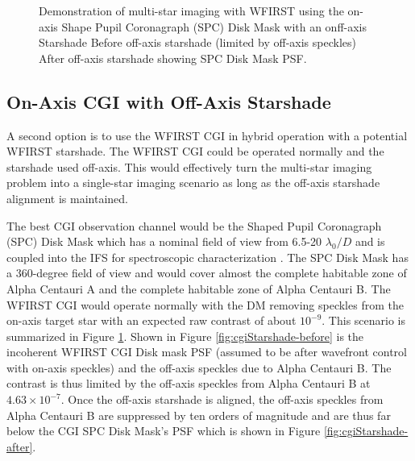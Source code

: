 \documentclass[]{spie}  %
\begin{document}
\begin{figure}[t!]
\centering
{}
\caption[Companion Leakage]
{\label{fig:cgiStarshade} Demonstration of multi-star imaging with WFIRST using the on-axis Shape Pupil Coronagraph (SPC) Disk Mask with an onff-axis Starshade  Before off-axis starshade (limited by off-axis speckles)  After off-axis starshade showing SPC Disk Mask PSF.}
\end{figure}

\subsection{On-Axis CGI with Off-Axis Starshade}

A second option is to use the WFIRST CGI in hybrid operation with a potential WFIRST starshade. The WFIRST CGI could be operated normally and the starshade used off-axis. This would effectively turn the multi-star imaging problem into a single-star imaging scenario as long as the off-axis starshade alignment is maintained.

The best CGI observation channel would be the Shaped Pupil Coronagraph (SPC) Disk Mask which has a nominal field of view from 6.5-20 $\lambda_0 / D$ and is coupled into the IFS for spectroscopic characterization \cite{Riggs17}. The SPC Disk Mask has a 360-degree field of view and would cover almost the complete habitable zone of Alpha Centauri A and the complete habitable zone of Alpha Centauri B. The WFIRST CGI would operate normally with the DM removing speckles from the on-axis target star with an expected raw contrast of about $10^{-9}$. This scenario is summarized in Figure \ref{fig:cgiStarshade}. Shown in Figure \ref{fig:cgiStarshade-before} is the incoherent WFIRST CGI Disk mask PSF (assumed to be after wavefront control with on-axis speckles) and the off-axis speckles due to Alpha Centauri B. The contrast is thus limited by the off-axis speckles from Alpha Centauri B at $4.63 \times 10^{-7}$. Once the off-axis starshade is aligned, the off-axis speckles from Alpha Centauri B are suppressed by ten orders of magnitude and are thus far below the CGI SPC Disk Mask's PSF which is shown in Figure \ref{fig:cgiStarshade-after}.
\end{document}
